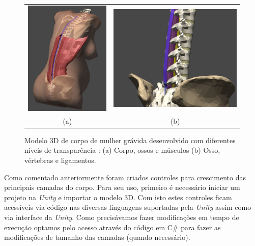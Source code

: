 \begin{figure}[ht!]
    \centering
        \begin{tabular}{cc}
        \includegraphics[width=0.4\linewidth]{capitulos/figuras/modelo corpo 3d.PNG} & 
        \includegraphics[width=0.5\linewidth]{capitulos/figuras/modelo corpo 3d - coluna vertebral, ligamentos supra, interespinhoso and flavum.PNG} 
        \\
        (a) & (b)
        \end{tabular}
    \caption{Modelo 3D de corpo de mulher grávida desenvolvido com diferentes níveis de transparência \cite{Melo2021}: (a) Corpo, ossos e músculos (b) Osso, vértebras e ligamentos.}
    \label{fig:modelo3Dcorpo}
\end{figure}

Como comentado anteriormente foram criados controles para crescimento das principais camadas do corpo. Para seu uso, primeiro é necessário iniciar um projeto na \textit{Unity} e importar o modelo 3D. Com isto estes controles ficam acessíveis via código nas diversas linguagens suportadas pela \textit{Unity} assim como via interface da \textit{Unity}. Como precisávamos fazer modificações em tempo de execução optamos pelo acesso através do código em C\# para fazer as modificações de tamanho das camadas (quando necessário). 

